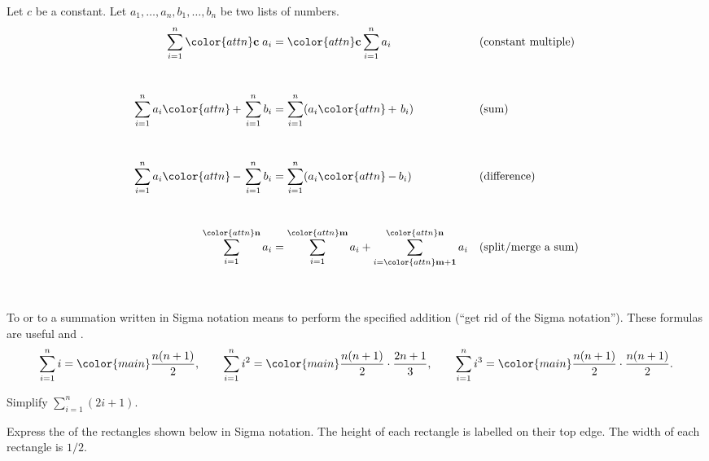 \documentclass[../main.tex]{subfiles}
\begin{document}
  \clearpage
  \begin{mdframed}[style=withref-compact]
    \label{page:summation-properties}
    Let \(c\) be a constant. Let \(a_{1}, \dots, a_{n}, b_{1}, \dots, b_{n}\) be two lists of numbers. 
    \begin{align*}
      \sum_{i=1}^{n} {\color{attn} \mathbf{c}} \; a_{i} 
      &= {\color{attn} \mathbf{c}} \sum_{i=1}^{n} a_{i} 
      &&\text{(constant multiple)} \\[6ex]
      \sum_{i=1}^{n} a_{i} {\color{attn}\,\mathbf{+}\,} \sum_{i=1}^{n} b_{i} 
      &= \sum_{i=1}^{n} (a_{i} {\color{attn}\,\mathbf{+}\,}\, b_{i}) 
      &&\text{(sum)} \\[6ex]
      \sum_{i=1}^{n} a_{i} {\color{attn}\,\mathbf{-}\,} \sum_{i=1}^{n} b_{i} 
      &= \sum_{i=1}^{n} (a_{i} {\color{attn}\,\mathbf{-}\,} b_{i})
      && \text{(difference)} \\[6ex]
      \sum_{i=1}^{{\color{attn}\mathbf{n}}} a_{i} 
      &= 
      \sum_{i=1}^{{\color{attn}\mathbf{m}}} a_{i} + 
      \sum_{i={\color{attn}\mathbf{m+1}}}^{{\color{attn}\mathbf{n}}} a_{i} 
      && \text{(split/merge a sum)} \\[6ex]
    \end{align*}

  \end{mdframed}

  To  or to  a summation written in Sigma notation means to perform the specified addition (``get rid of the Sigma notation'').  These formulas are useful and .
  \begin{equation} \label{formula:summations}
    \sum_{i=1}^{n} i = {\color{main} \frac{n(n+1)}{2}}, \qquad \sum_{i=1}^{n} i^{2} = {\color{main}\frac{n(n+1)}{2}} \cdot \frac{2n+1}{3}, \qquad \sum_{i=1}^{n} i^{3} = {\color{main}\frac{n(n+1)}{2}} \cdot \frac{n(n+1)}{2}.
  \end{equation}

  \begin{example}
    Simplify \(\sum_{i=1}^{n}(2i + 1)\).
  \end{example}
  \clearpage

  \begin{example}
    Express the  of the rectangles shown below in Sigma notation. The height of each rectangle is labelled on their top edge. The width of each rectangle is \(1/2\).

    \begin{center}
      
    \end{center}
  \end{example}
  \clearpage
\end{document}
